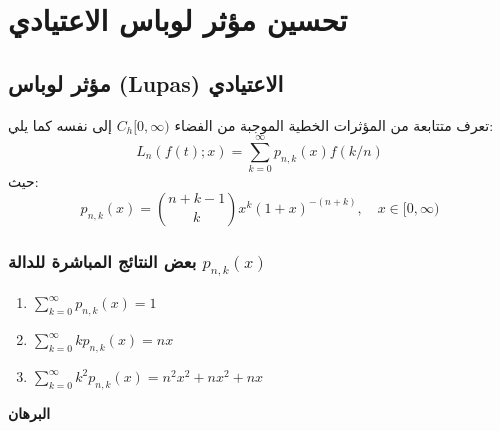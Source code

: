 \chapter{تحسين مؤثر لوباس الاعتيادي}
\section{مؤثر لوباس (Lupas) الاعتيادي}

تعرف متتابعة من المؤثرات الخطية الموجبة من الفضاء $C_h[0, \infty)$ إلى نفسه كما يلي:
\[
L_n(f(t); x) = \sum_{k=0}^{\infty} p_{n,k} (x) f(k/n)
\]
حيث:
\[
p_{n,k} (x) = \binom{n+k-1}{k} x^k (1+x)^{-(n+k)}, \quad x \in [0, \infty)
\]

\subsection*{بعض النتائج المباشرة للدالة $p_{n,k}(x)$}
\begin{english}
	\begin{enumerate}[label=\arabic*)]
		\item $\sum_{k=0}^{\infty} p_{n,k}(x) = 1$
		\item $\sum_{k=0}^{\infty}k p_{n,k}(x) = nx$
		\item $\sum_{k=0}^{\infty}k^2 p_{n,k}(x) = n^2 x^2 + nx^2 + nx$
	\end{enumerate}
\end{english}
\noindent
\textbf{البرهان}

